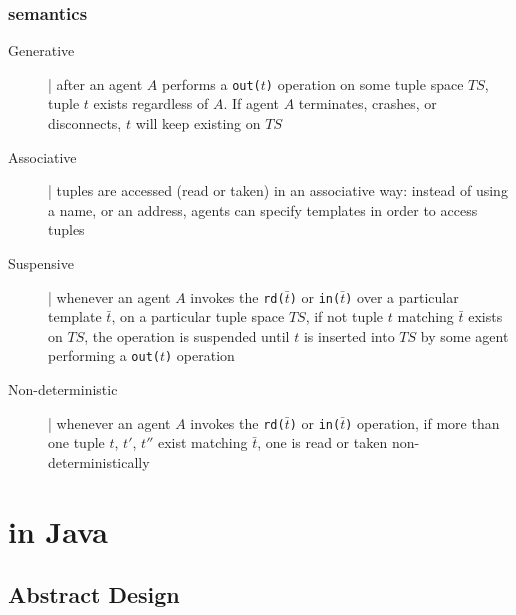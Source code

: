 \documentclass[presentation]{beamer}\mode<presentation>{\usetheme{AMSCesenaPurpleAndGold}}
\begin{document}
\begin{frame}[fragile]
\frametitle{ semantics}
\label{linda-semantics}
	
	\begin{description}
		\item[Generative] | after an agent $A$ performs a \texttt{out($t$)} operation on some tuple space $TS$, tuple $t$ \alert{exists} regardless of $A$. 
		If agent $A$ terminates, crashes, or disconnects, $t$ will keep existing on $TS$
		
		\item[Associative] | tuples are \alert{accessed} (read or taken) in an associative way: instead of using a name, or an address, agents can specify \alert{templates} in order to access tuples
		
		\item[Suspensive] | whenever an agent $A$ invokes the \texttt{rd($\bar{t}$)} or \texttt{in($\bar{t}$)} over a particular template $\bar{t}$, on a particular tuple space $TS$, if not tuple $t$ matching $\bar{t}$ exists on $TS$, the operation is \alert{suspended} until $t$ is inserted into $TS$ by some agent performing a \texttt{out($t$)} operation
		
		\item[Non-deterministic] | whenever an agent $A$ invokes the \texttt{rd($\bar{t}$)} or \texttt{in($\bar{t}$)} operation, if more than one tuple $t$, $t'$, $t''$ exist matching  $\bar{t}$, one is read or taken  \alert{non-deterministically}
	
	\end{description}

\end{frame}


\section{\linda{} in Java}

\subsection{Abstract Design}
\end{document}
